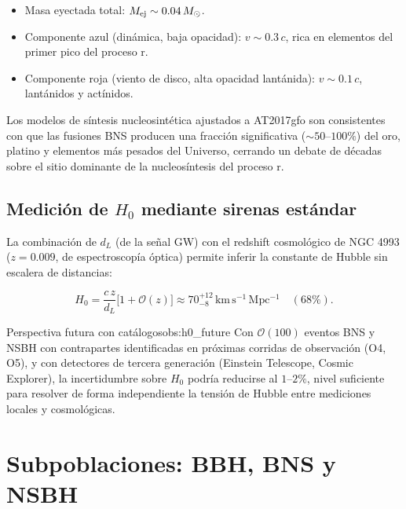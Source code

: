 \begin{itemize}[leftmargin=2em]
  \item Masa eyectada total: $M_{\rm ej} \sim 0.04\,M_\odot$.
  \item Componente azul (dinámica, baja opacidad): $v \sim 0.3\,c$, rica en elementos del primer pico del proceso r.
  \item Componente roja (viento de disco, alta opacidad lantánida): $v \sim 0.1\,c$, lantánidos y actínidos.
\end{itemize}

\begin{importante}
Los modelos de síntesis nucleosintética ajustados a AT2017gfo son consistentes con que las fusiones BNS producen una fracción significativa ($\sim 50\text{--}100\%$) del oro, platino y elementos más pesados del Universo, cerrando un debate de décadas sobre el sitio dominante de la nucleosíntesis del proceso r.
\end{importante}

\subsection{Medición de $H_0$ mediante sirenas estándar}

La combinación de $d_L$ (de la señal GW) con el redshift cosmológico de NGC 4993 ($z = 0.009$, de espectroscopía óptica) permite inferir la constante de Hubble sin escalera de distancias:

\begin{equation}
  H_0 = \frac{c\,z}{d_L}\bigl[1 + \mathcal{O}(z)\bigr]
  \approx 70^{+12}_{-8}\,\mathrm{km\,s^{-1}\,Mpc^{-1}}\quad(68\%).
  \label{eq:H0_gw170817}
\end{equation}

\begin{observacion}{Perspectiva futura con catálogos}{obs:h0_future}
Con $\mathcal{O}(100)$ eventos BNS y NSBH con contrapartes identificadas en próximas corridas de observación (O4, O5), y con detectores de tercera generación (Einstein Telescope, Cosmic Explorer), la incertidumbre sobre $H_0$ podría reducirse al $1\text{--}2\%$, nivel suficiente para resolver de forma independiente la tensión de Hubble entre mediciones locales y cosmológicas.
\end{observacion}

\section{Subpoblaciones: BBH, BNS y NSBH}
\label{sec:subpoblaciones_cbc}

